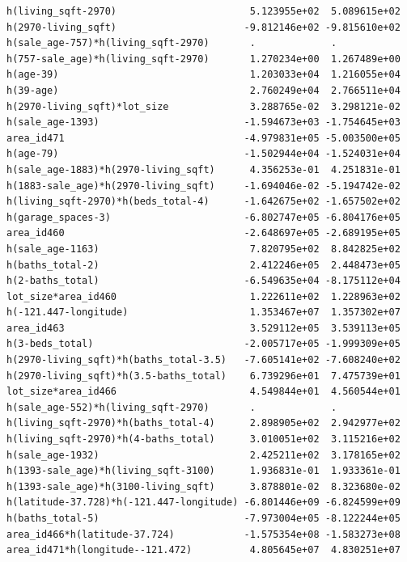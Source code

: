 \documentclass[
]{article}
\begin{document}
\begin{verbatim}
h(living_sqft-2970)                       5.123955e+02  5.089615e+02
h(2970-living_sqft)                      -9.812146e+02 -9.815610e+02
h(sale_age-757)*h(living_sqft-2970)       .             .           
h(757-sale_age)*h(living_sqft-2970)       1.270234e+00  1.267489e+00
h(age-39)                                 1.203033e+04  1.216055e+04
h(39-age)                                 2.760249e+04  2.766511e+04
h(2970-living_sqft)*lot_size              3.288765e-02  3.298121e-02
h(sale_age-1393)                         -1.594673e+03 -1.754645e+03
area_id471                               -4.979831e+05 -5.003500e+05
h(age-79)                                -1.502944e+04 -1.524031e+04
h(sale_age-1883)*h(2970-living_sqft)      4.356253e-01  4.251831e-01
h(1883-sale_age)*h(2970-living_sqft)     -1.694046e-02 -5.194742e-02
h(living_sqft-2970)*h(beds_total-4)      -1.642675e+02 -1.657502e+02
h(garage_spaces-3)                       -6.802747e+05 -6.804176e+05
area_id460                               -2.648697e+05 -2.689195e+05
h(sale_age-1163)                          7.820795e+02  8.842825e+02
h(baths_total-2)                          2.412246e+05  2.448473e+05
h(2-baths_total)                         -6.549635e+04 -8.175112e+04
lot_size*area_id460                       1.222611e+02  1.228963e+02
h(-121.447-longitude)                     1.353467e+07  1.357302e+07
area_id463                                3.529112e+05  3.539113e+05
h(3-beds_total)                          -2.005717e+05 -1.999309e+05
h(2970-living_sqft)*h(baths_total-3.5)   -7.605141e+02 -7.608240e+02
h(2970-living_sqft)*h(3.5-baths_total)    6.739296e+01  7.475739e+01
lot_size*area_id466                       4.549844e+01  4.560544e+01
h(sale_age-552)*h(living_sqft-2970)       .             .           
h(living_sqft-2970)*h(baths_total-4)      2.898905e+02  2.942977e+02
h(living_sqft-2970)*h(4-baths_total)      3.010051e+02  3.115216e+02
h(sale_age-1932)                          2.425211e+02  3.178165e+02
h(1393-sale_age)*h(living_sqft-3100)      1.936831e-01  1.933361e-01
h(1393-sale_age)*h(3100-living_sqft)      3.878801e-02  8.323680e-02
h(latitude-37.728)*h(-121.447-longitude) -6.801446e+09 -6.824599e+09
h(baths_total-5)                         -7.973004e+05 -8.122244e+05
area_id466*h(latitude-37.724)            -1.575354e+08 -1.583273e+08
area_id471*h(longitude--121.472)          4.805645e+07  4.830251e+07
                                                                    

\end{verbatim}
\end{document}

